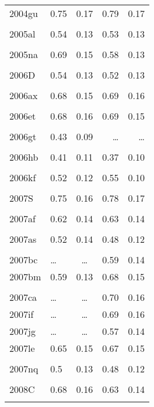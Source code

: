 \begin{table}
\begin{minipage}{70mm}
\begin{center}
\begin{tabular}{llcrr}
2004gu & 0.75 & 0.17 & 0.79 & 0.17	\\ \\
2005al & 0.54 & 0.13 & 0.53 & 0.13	\\ \\
2005na & 0.69 & 0.15 & 0.58 & 0.13	\\ \\
2006D & 0.54 & 0.13 & 0.52 & 0.13	\\ \\
2006ax & 0.68 & 0.15 & 0.69 & 0.16	\\ \\
2006et & 0.68 & 0.16 & 0.69 & 0.15	\\ \\
2006gt & 0.43 & 0.09 & \ldots & \ldots\\ \\
2006hb & 0.41 & 0.11 & 0.37 & 0.10	\\ \\
2006kf & 0.52 & 0.12 & 0.55 & 0.10	\\ \\
2007S & 0.75 & 0.16 & 0.78 & 0.17	\\ \\
2007af & 0.62 & 0.14 & 0.63 & 0.14	\\ \\
2007as & 0.52 & 0.14 & 0.48 & 0.12	\\ \\
2007bc  &\ldots & \ldots & 0.59 &  0.14 \\
2007bm & 0.59 & 0.13 & 0.68 & 0.15	\\ \\
2007ca  &\ldots & \ldots & 0.70 &  0.16 \\
2007if  &\ldots & \ldots & 0.69 & 0.16 \\
2007jg  &\ldots & \ldots & 0.57 & 0.14  \\
2007le & 0.65 & 0.15 & 0.67 & 0.15	\\ \\
2007nq & 0.5 & 0.13 & 0.48 & 0.12	\\ \\
2008C & 0.68 & 0.16 & 0.63 & 0.14
	\\ \\
\hline
\end{tabular}
\end{center}
\end{minipage}
\label{tab:yj}
\end{table}
